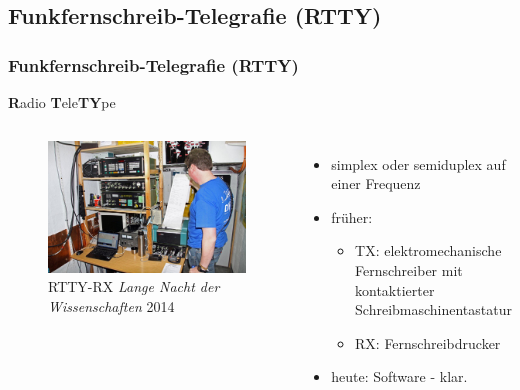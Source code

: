 \subsection[RTTY]{Funkfernschreib-Telegrafie (RTTY)}

\begin{frame}
  \frametitle{Funkfernschreib-Telegrafie (RTTY)}

  \textbf{R}adio \textbf{T}ele\textbf{TY}pe

  \begin{columns}
    \begin{figure}
      \includegraphics[width=\textwidth,height=.6\textheight,keepaspectratio]{e16/RTTY_LNDW2014.jpg}
      \caption{RTTY-RX \emph{Lange Nacht der Wissenschaften} 2014}
    \end{figure}


    \begin{itemize}
      \item simplex oder semiduplex auf einer Frequenz
      \item früher:
        \begin{itemize}
          \item TX: elektromechanische Fernschreiber mit kontaktierter
            Schreibmaschinentastatur
          \item RX: Fernschreibdrucker
        \end{itemize}
      \item heute: Software - klar.
    \end{itemize}
  \end{columns}

\end{frame}

